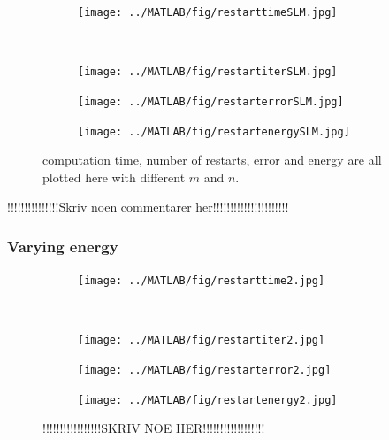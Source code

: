 \begin{figure}[H]
        \centering
        \begin{subfigure}[b]{0.45\textwidth}
                \texttt{[image: ../MATLAB/fig/restarttimeSLM.jpg]}
                \caption{  }
                \label{fig:restarttimeSLM}
        \end{subfigure}
        ~
        \begin{subfigure}[b]{0.45\textwidth}
                \texttt{[image: ../MATLAB/fig/restartiterSLM.jpg]}
                \caption{  }
                \label{fig:restartiterSLM}
        \end{subfigure}
        \begin{subfigure}[b]{0.45\textwidth}
                \texttt{[image: ../MATLAB/fig/restarterrorSLM.jpg]}
                \caption{  }
                \label{fig:restarterrorSLM}
        \end{subfigure}
        \begin{subfigure}[b]{0.45\textwidth}
                \texttt{[image: ../MATLAB/fig/restartenergySLM.jpg]}
                \caption{  }
                \label{fig:restartenergySLM}
        \end{subfigure}
        \caption{ computation time, number of restarts, error and energy are all plotted here with different $m$ and $n$. }
        \label{fig:restartSLM}
\end{figure}
!!!!!!!!!!!!!!!Skriv noen commentarer her!!!!!!!!!!!!!!!!!!!!!!\\
\subsubsection{Varying energy}%
\begin{figure}[H]
        \centering
        \begin{subfigure}[b]{0.45\textwidth}
                \texttt{[image: ../MATLAB/fig/restarttime2.jpg]}
                \caption{  }
                \label{fig:restarttime2}
        \end{subfigure}
        ~
        \begin{subfigure}[b]{0.45\textwidth}
                \texttt{[image: ../MATLAB/fig/restartiter2.jpg]}
                \caption{  }
                \label{fig:restartiter2}
        \end{subfigure}
        \begin{subfigure}[b]{0.45\textwidth}
                \texttt{[image: ../MATLAB/fig/restarterror2.jpg]}
                \caption{  }
                \label{fig:restarterror2}
        \end{subfigure}
        \begin{subfigure}[b]{0.45\textwidth}
                \texttt{[image: ../MATLAB/fig/restartenergy2.jpg]}
                \caption{  }
                \label{fig:restartenergy2}
        \end{subfigure}
        \caption{ !!!!!!!!!!!!!!!!!SKRIV NOE HER!!!!!!!!!!!!!!!!!!  }
        \label{fig:restart2}
\end{figure}


